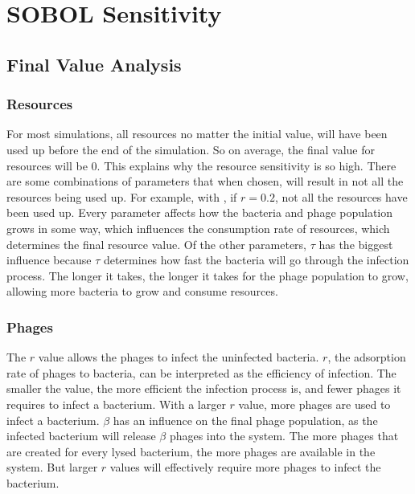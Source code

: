 \section{SOBOL Sensitivity}
\subsection{Final Value Analysis}
\subsubsection{Resources}
For most simulations, all resources no matter the initial value, will have been used up before the end of the simulation. 
So on average, the final value for resources will be 0. 
This explains why the resource sensitivity is so high. 
There are some combinations of parameters that when chosen, will result in not all the resources being used up. 
For example, with , if $r=0.2$, not all the resources have been used up. 
Every parameter affects how the bacteria and phage population grows in some way, which influences the consumption rate of resources, which determines the final resource value. 
Of the other parameters, $\tau$ has the biggest influence because $\tau$ determines how fast the bacteria will go through the infection process. 
The longer it takes, the longer it takes for the phage population to grow, allowing more bacteria to grow and consume resources. 

\subsubsection{Phages}
The $r$ value allows the phages to infect the uninfected bacteria. 
$r$, the adsorption rate of phages to bacteria, can be interpreted as the efficiency of infection. 
The smaller the value, the more efficient the infection process is, and fewer phages it requires to infect a bacterium. 
With a larger $r$ value, more phages are used to infect a bacterium. 
$\beta$ has an influence on the final phage population, as the infected bacterium will release $\beta$ phages into the system. 
The more phages that are created for every lysed bacterium, the more phages are available in the system. 
But larger $r$ values will effectively require more phages to infect the bacterium. 

